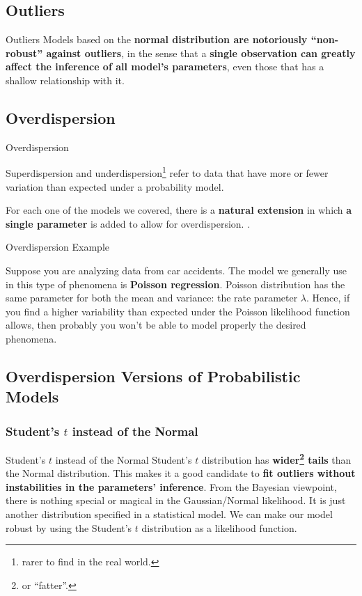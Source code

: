 \subsection{Outliers}
\begin{frame}{Outliers}
	Models based on the \textbf{normal distribution are notoriously ``non-robust''
		against outliers},
	in the sense that a \textbf{single observation can greatly affect the
		inference of all model's parameters},
	even those that has a shallow relationship with it.
\end{frame}

\subsection{Overdispersion}
\begin{frame}{Overdispersion}
	\begin{defn}
		Superdispersion and underdispersion\footnote{
			rarer to find in the real world.}
		refer to data that have more or fewer variation than expected
		under a probability model.
		\parencite{gelman2020regression}
	\end{defn}
	\vfill
	For each one of the models we covered, there is a \textbf{natural extension}
	in which \textbf{a single parameter} is added to allow for overdispersion.
	\parencite{gelman2013bayesian}.
\end{frame}

\begin{frame}{Overdispersion Example}
	\begin{example}
		Suppose you are analyzing data from car accidents.
		The model we generally use in this type of phenomena is
		\textbf{Poisson regression}.
		\vfill
		Poisson distribution has the same parameter for both the mean and variance:
		the rate parameter $\lambda$.
		\vfill
		Hence, if you find a higher variability than expected under the
		Poisson likelihood function allows,
		then probably you won't be able to model properly the desired phenomena.
	\end{example}
\end{frame}

\subsection{Overdispersion Versions of Probabilistic Models}
\subsubsection{Student's $t$ instead of the Normal}
\begin{frame}{Student's $t$ instead of the Normal}
	Student's $t$ distribution has \textbf{wider\footnote{or ``fatter''.} tails}
	than the Normal distribution.
	\vfill
	This makes it a good candidate to \textbf{fit outliers without
		instabilities in the parameters' inference}.
	\vfill
	From the Bayesian viewpoint, there is nothing special or magical in the
	Gaussian/Normal likelihood.
	It is just another distribution specified in a statistical model.
	We can make our model robust by using the Student's $t$ distribution
	as a likelihood function.
\end{frame}

